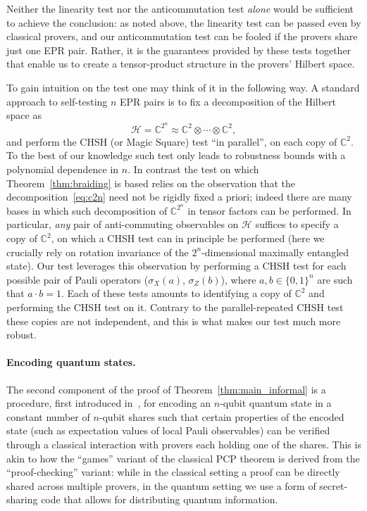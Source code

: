 \documentclass[11pt,letterpaper]{article}
\newcommand{\<}{\langle}
\renewcommand{\>}{\rangle}
\newcommand{\mH}{\mathcal{H}}
\newcommand{\C}{\mathbb{C}}
\begin{document}
Neither the linearity test nor the
anticommutation test \emph{alone} would be  sufficient to achieve the
conclusion: as noted above, the linearity test can be passed even by
classical provers, and our anticommutation test can be fooled if the
provers share just one EPR pair. Rather, it is the guarantees provided
by these tests together that enable us to create a tensor-product
structure in the provers' Hilbert space. 

To gain intuition on the test one may think of it in the following way. A standard approach to self-testing $n$ EPR pairs is to fix a decomposition of the Hilbert space as 
\begin{equation}\label{eq:c2n}
\mH = \C^{2^n} \approx \C^2 \otimes \cdots \otimes \C^2,
\end{equation}
and perform the CHSH (or Magic Square) test ``in parallel'', on each copy of $\C^2$. To the best of our knowledge such test only leads to robustness bounds with a polynomial dependence in $n$. In contrast the test on which Theorem~\ref{thm:braiding} is based relies on the observation that the decomposition~\eqref{eq:c2n} need not be rigidly fixed a priori; indeed there are many bases in which such decomposition of $\C^{2^n}$ in tensor factors can be performed. In particular,  \emph{any} pair of anti-commuting observables on $\mH$ suffices to specify a copy of $\C^2$, on which a CHSH test can in principle be performed (here we crucially rely on rotation invariance of the $2^n$-dimensional maximally entangled state). Our test leverages this observation by performing a CHSH test for each possible pair of Pauli operators ($\sigma_X(a)$, $\sigma_Z(b)$), where $a,b\in\{0,1\}^n$ are such that $a\cdot b=1$. Each of these tests amounts to identifying a copy of $\C^2$ and performing the CHSH test on it. Contrary to the parallel-repeated CHSH test these copies are not independent, and this is what makes our test much more robust. 

\paragraph{Encoding quantum states.}
The second component of the proof of Theorem~\ref{thm:main_informal} is a
procedure, first introduced in~\cite{FV14,ji2015classical}, for
encoding an $n$-qubit quantum state in a constant number of $n$-qubit
shares such that certain properties of the encoded state (such as
expectation values of local Pauli observables) can be verified through
a classical interaction with provers each holding one of the
shares. This is akin to how the ``games'' variant of the classical PCP
theorem is derived from the ``proof-checking'' variant: while in the
classical setting a proof can be directly shared across multiple
provers, in the quantum setting we use a form of secret-sharing code
that allows for distributing quantum information.
\end{document}

